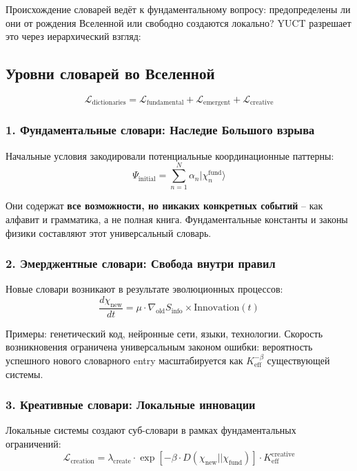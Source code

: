\documentclass[12pt,a4paper]{article}
\newcommand{\eff}{\mathrm{eff}}
\newcommand{\Ke}{K_{\eff}}
\begin{document}
	Происхождение словарей ведёт к фундаментальному вопросу: предопределены ли они от рождения Вселенной или свободно создаются локально? YUCT разрешает это через иерархический взгляд:
	
	\subsection{Уровни словарей во Вселенной}
	
	\[
	\mathcal{L}_{\text{dictionaries}} = \mathcal{L}_{\text{fundamental}} + \mathcal{L}_{\text{emergent}} + \mathcal{L}_{\text{creative}}
	\]
	
	\subsubsection{1. Фундаментальные словари: Наследие Большого взрыва}
	
	Начальные условия закодировали потенциальные координационные паттерны:
	\[
	\Psi_{\text{initial}} = \sum_{n=1}^N \alpha_n |\chi_n^{\text{fund}}\rangle
	\]
	
	Они содержат \textbf{все возможности, но никаких конкретных событий} – как алфавит и грамматика, а не полная книга. Фундаментальные константы и законы физики составляют этот универсальный словарь.
	
	\subsubsection{2. Эмерджентные словари: Свобода внутри правил}
	
	Новые словари возникают в результате эволюционных процессов:
	\[
	\frac{d\chi_{\text{new}}}{dt} = \mu \cdot \nabla_{\text{old}} S_{\text{info}} \times \text{Innovation}(t)
	\]
	
	Примеры: генетический код, нейронные сети, языки, технологии. Скорость возникновения ограничена универсальным законом ошибки: вероятность успешного нового словарного entry масштабируется как $\Ke^{-\beta}$ существующей системы.
	
	\subsubsection{3. Креативные словари: Локальные инновации}
	
	Локальные системы создают суб-словари в рамках фундаментальных ограничений:
	\[
	\mathcal{L}_{\text{creation}} = \lambda_{\text{create}} \cdot \exp\left[-\beta \cdot D(\chi_{\text{new}} || \chi_{\text{fund}})\right] \cdot \Ke^{\text{creative}}
	\]
	
\end{document}
